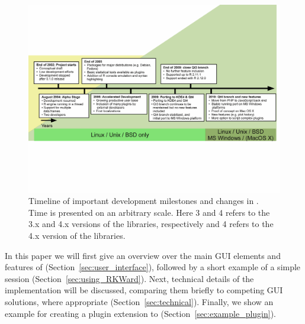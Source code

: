 \begin{figure}[t!]
 \centering
 \includegraphics[clip=true,trim=0cm 5.7cm 0cm 5.7cm,width=16cm]{../figures/timeline.pdf}
 \caption{Timeline of important development milestones and changes in .
          Time is presented on an arbitrary scale. Here 3 and 4 refers to the 3.x and
          4.x versions of the  libraries, respectively and 4 refers to the
          4.x version of the  libraries.}
 \label{fig:timeline}
\end{figure}

In this paper we will first give an overview over the main GUI elements and
features of  (Section~\ref{sec:user_interface}), followed by a short example 
of a simple  session (Section~\ref{sec:using_RKWard}). Next, technical 
details of the implementation will be discussed, comparing them briefly to 
competing GUI solutions, where appropriate (Section~\ref{sec:technical}).
Finally, we show an example for creating a plugin extension to  
(Section~\ref{sec:example_plugin}).
